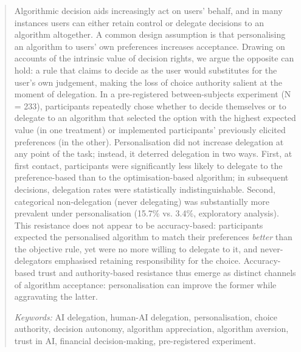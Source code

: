 \documentclass[a4paper, 12pt, fleqn]{article}
\theoremstyle{hypstyle}
\begin{document}
\begin{abstract}
  Algorithmic decision aids increasingly act on users’ behalf, and in many instances users can either retain control or delegate decisions to an algorithm altogether. A common design assumption is that personalising an algorithm to users' own preferences increases acceptance. Drawing on accounts of the intrinsic value of decision rights, we argue the opposite can hold: a rule that claims to decide as the user would substitutes for the user's own judgement, making the loss of choice authority salient at the moment of delegation. In a pre-registered between-subjects experiment (N = 233), participants repeatedly chose whether to decide themselves or to delegate to an algorithm that selected the option with the highest expected value (in one treatment) or implemented participants' previously elicited preferences (in the other). Personalisation did not increase delegation at any point of the task; instead, it deterred delegation in two ways. First, at first contact, participants were significantly less likely to delegate to the preference-based than to the optimisation-based algorithm; in subsequent decisions, delegation rates were statistically indistinguishable. Second, categorical non-delegation (never delegating) was substantially more prevalent under personalisation (15.7\% vs. 3.4\%, exploratory analysis). 
  This resistance does not appear to be accuracy-based: participants expected the personalised algorithm to match their preferences \emph{better} than the objective rule, yet were no more willing to delegate to it, and never-delegators emphasised retaining responsibility for the choice. Accuracy-based trust and authority-based resistance thus emerge as distinct channels of algorithm acceptance: personalisation can improve the former while aggravating the latter.
  
     \vspace{.25cm}
  \textit{Keywords:} {AI delegation, human-AI delegation, personalisation, choice authority, decision autonomy, algorithm appreciation, algorithm aversion, trust in AI, financial decision-making, pre-registered experiment.}\vspace{.15cm}
\end{abstract}
\vspace{-.5cm}
\end{document}
